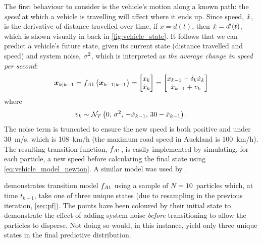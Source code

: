The first behaviour to consider is the vehicle's motion along a known path: the \emph{speed} at which a vehicle is travelling will affect where it ends up. Since speed, $\dot x$, is the derivative of distance travelled over time, if $x = d(t)$, then $\dot x = d'(t)$, which is shown visually in back in \cref{fig:vehicle_state}. It follows that we can predict a vehicle's future state, given its current state (distance travelled and speed) and system noise, $\sigma^2$, which is interpreted as \emph{the average change in speed per second}:
\begin{equation}
\label{eq:vehicle_model_newton}
\boldsymbol x_{k|k-1} = f_{A1}\left(\boldsymbol x_{k-1|k-1}\right) =
\begin{bmatrix}
x_k \\ \dot x_k
\end{bmatrix} =
\begin{bmatrix}
x_{k-1} + \delta_k\dot x_k \\
\dot x_{k-1} + v_k
\end{bmatrix}
\end{equation}
where
\begin{equation}\label{eq:vehicle_model_newton_noise}
v_k \sim \mathcal{N}_T\left(0,\, \sigma^2,\, -\dot x_{k-1},\, 30 - \dot x_{k-1}\right).
\end{equation}
The noise term is truncated to ensure the new speed is both positive and under 30~m/s, which is 108~km/h (the maximum road speed in Auckland is 100~km/h). The resulting transition function, $f_{A1}$, is easily implemented by simulating, for each particle, a new speed before calculating the final state using \cref{eq:vehicle_model_newton}. A similar model was used by \citet{Cathey_2003,Dailey_2001}.


 demonstrates transition model $f_{A1}$ using a sample of $N=10$~particles which, at time $t_{k-1}$, take one of three unique states (due to resampling in the previous iteration, \cref{sec:pf}). The points have been coloured by their initial state to demonstrate the effect of adding system noise \emph{before} transitioning to allow the particles to disperse. Not doing so would, in this instance, yield only three unique states in the final predictive distribution.

